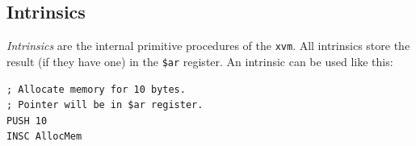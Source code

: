 \documentclass{report}
\def\xvm{\texttt{xvm}\xspace}
\begin{document}
\subsection{Intrinsics}

\textit{Intrinsics} are the internal primitive procedures of the \xvm. All intrinsics store the result
(if they have one) in the \texttt{\$ar} register. An intrinsic can be used like this:
\begin{lstlisting}
; Allocate memory for 10 bytes.
; Pointer will be in $ar register.
PUSH 10
INSC AllocMem
\end{lstlisting}
\end{document}
